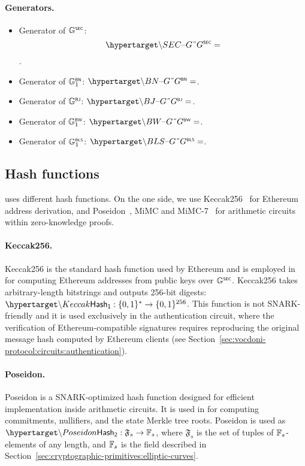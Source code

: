 \paragraph{Generators.}
\begin{itemize}
	\item Generator of ${\mathbb{G}}^{\text{\tiny \sf SEC}}$: \[\hlset{\SEC{G}} = \].
	\item Generator of ${\mathbb{G}}^{\text{\tiny \sf BN}}_1$: $\hlset{\BN{G}} = $.
	\item Generator of ${\mathbb{G}}^{\text{\tiny \sf BJ}}$: $\hlset{\BJ{G}} = $.
	\item Generator of ${\mathbb{G}}^{\text{\tiny \sf BW}}_1$: $\hlset{\BW{G}} = $.
	\item Generator of ${\mathbb{G}}^{\text{\tiny \sf BLS}}_1$: $\hlset{\BLS{G}} = $.
\end{itemize}

\subsection{Hash functions}
\label{sec:cryptographic-primitives:hash}

\Davinci uses different hash functions. On the one side, we use Keccak256~\cite{bertoni11keccak} for Ethereum address derivation, and Poseidon~\cite{grassi21poseidon}, MiMC and MiMC-7~\cite{albrecht16mimc} for arithmetic circuits within zero-knowledge proofs.

\paragraph{Keccak256.} Keccak256 is the standard hash function used by Ethereum and is employed in \davinci for computing Ethereum addresses from public keys over ${\mathbb{G}}^{\text{\tiny \sf SEC}}$. Keccak256 takes arbitrary-length bitstrings and outputs 256-bit digests: $\hlset{\Keccak} : \{0,1\}^* \rightarrow \{0,1\}^{256}$. This function is not SNARK-friendly and it is used exclusively in the authentication circuit, where the verification of Ethereum-compatible signatures requires reproducing the original message hash computed by Ethereum clients (see Section~\ref{sec:vocdoni-protocol:circuits:authentication}).


\paragraph{Poseidon.} Poseidon is a SNARK-optimized hash function designed for efficient implementation inside arithmetic circuits. It is used in \davinci for computing commitments, nullifiers, and the state Merkle tree roots. Poseidon is used as $\hlset{\Poseidon} : \mathfrak{F}_s \rightarrow \F_s$, where $\mathfrak{F}_s$ is the set of tuples of $\mathbb{F}_s$-elements of any length, and $\mathbb{F}_s$ is the field described in Section~\ref{sec:cryptographic-primitives:elliptic-curves}.


